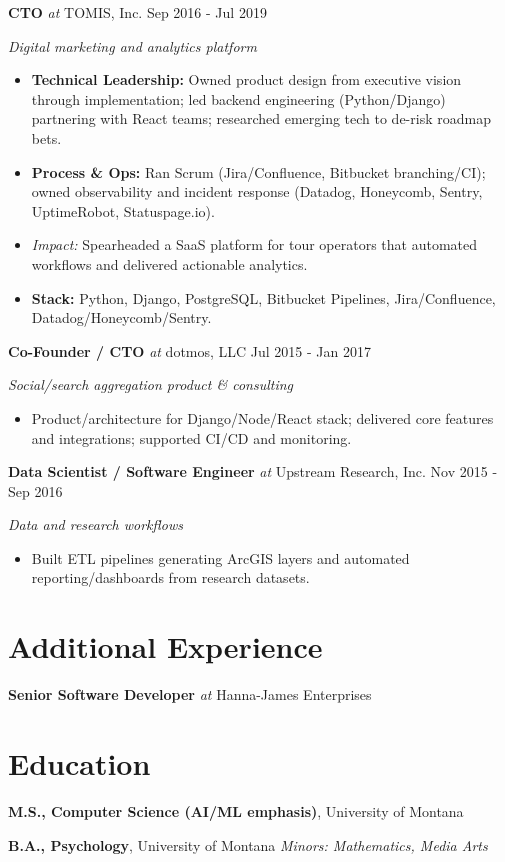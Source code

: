 \documentclass[10pt]{article}
\newcommand{\roleline}[4]{%
  \noindent\textbf{#1} \textit{at} #2 #3 \hfill #4\par
}
\begin{document}
\roleline{CTO}{TOMIS, Inc.}{}{Sep 2016 - Jul 2019}
\emph{Digital marketing and analytics platform}\par
\begin{itemize}
  \item \textbf{Technical Leadership:} Owned product design from executive vision through implementation; led backend engineering (Python/Django) partnering with React teams; researched emerging tech to de-risk roadmap bets.
  \item \textbf{Process \& Ops:} Ran Scrum (Jira/Confluence, Bitbucket branching/CI); owned observability and incident response (Datadog, Honeycomb, Sentry, UptimeRobot, Statuspage.io).
  \item \textit{Impact:} Spearheaded a SaaS platform for tour operators that automated workflows and delivered actionable analytics.
  \item \textbf{Stack:} Python, Django, PostgreSQL, Bitbucket Pipelines, Jira/Confluence, Datadog/Honeycomb/Sentry.
\end{itemize}


\roleline{Co-Founder / CTO}{dotmos, LLC}{}{Jul 2015 - Jan 2017}
\emph{Social/search aggregation product \& consulting}\par
\begin{itemize}
  \item Product/architecture for Django/Node/React stack; delivered core features and integrations; supported CI/CD and monitoring.
\end{itemize}


\roleline{Data Scientist / Software Engineer}{Upstream Research, Inc.}{}{Nov 2015 - Sep 2016}
\emph{Data and research workflows}\par
\begin{itemize}
  \item Built ETL pipelines generating ArcGIS layers and automated reporting/dashboards from research datasets.
\end{itemize}


\section*{Additional Experience}
\noindent\textbf{Senior Software Developer} \textit{at} Hanna-James Enterprises


\section*{Education}
\textbf{M.S., Computer Science (AI/ML emphasis)}, University of Montana\par
\textbf{B.A., Psychology}, University of Montana \quad \emph{Minors: Mathematics, Media Arts}


\end{document}
